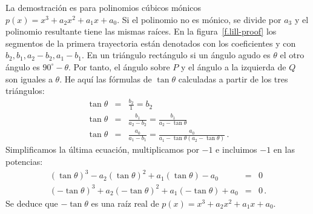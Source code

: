 La demostración es para polinomios cúbicos mónicos $p(x)=x^3+a_2x^2+a_1x+a_0$. Si el polinomio no es mónico, se divide por $a_3$ y el polinomio resultante tiene las mismas raíces. En la figura~\ref{f.lill-proof} los segmentos de la primera trayectoria están denotados con los coeficientes y con $b_2,b_1,a_2-b_2,a_1-b_1$. En un triángulo rectángulo si un ángulo agudo es $\theta$ el otro ángulo es $90^\circ-\theta$. Por tanto, el ángulo sobre $P$ y el ángulo a la izquierda de $Q$ son iguales a $\theta$. He aquí las fórmulas de $\tan \theta$ calculadas a partir de los tres triángulos:
\begin{eqnarray*}
\tan \theta &=& \frac{b_2}{1}=b_2\\
\tan \theta &=& \frac{b_1}{a_2-b_2}=\frac{b_1}{a_2-\tan\theta}\\
\tan \theta &=& \frac{a_0}{a_1-b_1}=\frac{a_0}{a_1-\tan\theta(a_2-\tan\theta)}\,.
\end{eqnarray*}
Simplificamos la última ecuación, multiplicamos por $-1$ e incluimos $-1$ en las potencias:
\begin{eqnarray*}
(\tan\theta)^3-a_2(\tan\theta)^2+a_1(\tan\theta)-a_0&=&0\\
(-\tan\theta)^3+a_2(-\tan\theta)^2+a_1(-\tan\theta)+a_0&=&0\,.
\end{eqnarray*}
Se deduce que $-\tan\theta$ es una raíz real de $p(x)=x^3+a_2x^2+a_1x+a_0$.

